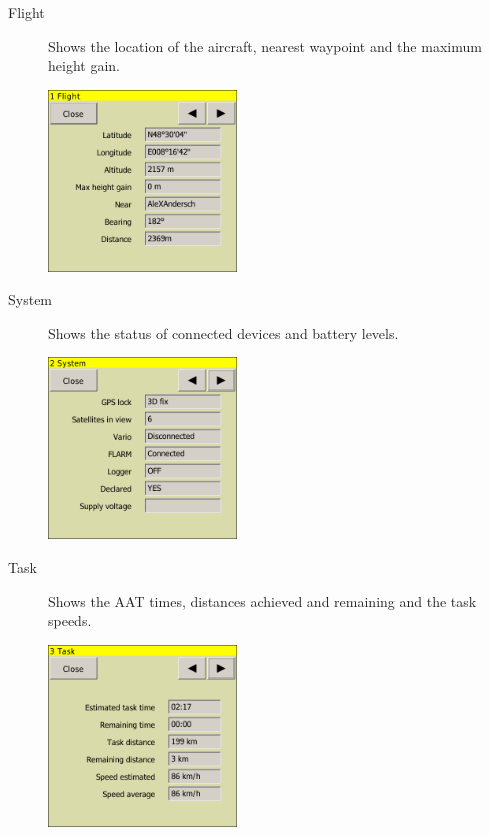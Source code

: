\documentclass[a4paper,12pt]{refrep}
\begin{document}
\begin{description}
\item[Flight] Shows the location of the aircraft, nearest waypoint and the
maximum height gain.
\begin{center}
\includegraphics[angle=0,width=5cm,keepaspectratio='true']{figures/status-aircraft.png}
\end{center}

\item[System] Shows the status of connected devices and battery levels.
\begin{center}
\includegraphics[angle=0,width=5cm,keepaspectratio='true']{figures/status-system.png}
\end{center}

\item[Task] Shows the AAT times, distances achieved and remaining
and the task speeds.
\begin{center}
\includegraphics[angle=0,width=5cm,keepaspectratio='true']{figures/status-task.png}
\end{center}


\end{description}
\end{document}
